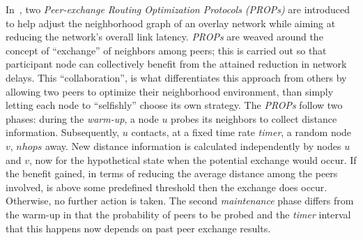 In~\cite{QCYCZ2007}, two 
\emph{Peer-exchange Routing Optimization Protocols (PROPs)} 
are introduced to help adjust the neighborhood graph of an overlay network
while aiming at reducing the network's overall link latency.
\emph{PROPs} are weaved around the concept of
``exchange'' of neighbors among peers; 
this is carried out so that participant node can collectively 
benefit from the attained reduction in network delays. 
This ``collaboration'', is what differentiates this approach 
from others by allowing two peers to optimize
their neighborhood environment, than simply letting each node to ``selfishly''
choose its own strategy. 
The \emph{PROPs} follow two phases: during the \emph{warm-up},
a node $u$ probes its neighbors to collect distance information. 
Subsequently, $u$ contacts, at a fixed time rate \emph{timer}, 
a random node $v$, $nhops$ away. %
New distance information is calculated independently 
by nodes $u$ and $v$, now for the
hypothetical state when the potential exchange would occur. 
If the benefit gained, in terms of reducing the average distance among the peers involved, is
above some predefined threshold then the exchange does occur.
Otherwise, no further action is taken. 
The second \emph{maintenance} phase
differs from the warm-up in that the probability
of peers to be probed and the \emph{timer} interval that this happens
now depends on past peer exchange results.

